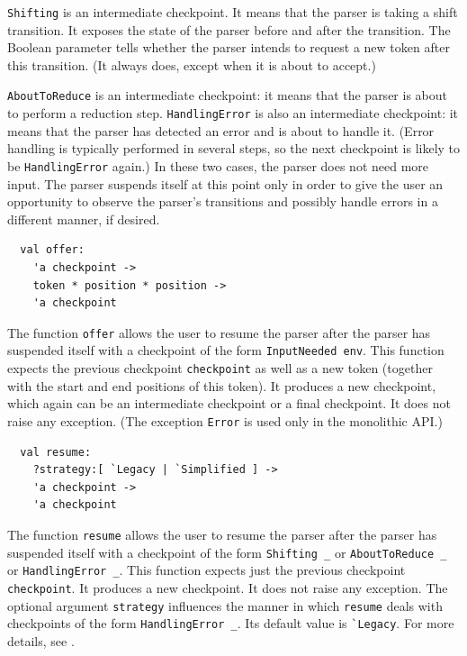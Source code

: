 \documentclass[onecolumn,11pt,nocopyrightspace,preprint]{sigplanconf}
\begin{document}
\verb+Shifting+ is an intermediate checkpoint. It means that the parser is taking
a shift transition. It exposes the state of the parser before and after the
transition. The Boolean parameter tells whether the parser intends to request
a new token after this transition. (It always does, except when it is about to
accept.)

\verb+AboutToReduce+ is an intermediate checkpoint: it means that the parser is
about to perform a reduction step. \verb+HandlingError+ is also an
intermediate checkpoint: it means that the parser has detected an error and is
about to handle it. (Error handling is typically performed in several steps,
so the next checkpoint is likely to be \verb+HandlingError+ again.) In these two
cases, the parser does not need more input. The parser suspends itself at this
point only in order to give the user an opportunity to observe the parser's
transitions and possibly handle errors in a different manner, if desired.


\begin{verbatim}
  val offer:
    'a checkpoint ->
    token * position * position ->
    'a checkpoint
\end{verbatim}

The function \verb+offer+ allows the user to resume the parser after the
parser has suspended itself with a checkpoint of the form \verb+InputNeeded env+.
This function expects the previous checkpoint \verb+checkpoint+ as well as a new token
(together with the start and end positions of this token). It produces a new
checkpoint, which again can be an intermediate checkpoint or a final checkpoint. It does
not raise any exception. (The exception \texttt{Error} is used only in the
monolithic API.)


\begin{verbatim}
  val resume:
    ?strategy:[ `Legacy | `Simplified ] ->
    'a checkpoint ->
    'a checkpoint
\end{verbatim}

The function \verb+resume+ allows the user to resume the parser after the
parser has suspended itself with a checkpoint of the form
\verb+Shifting _+ or \verb+AboutToReduce _+ or \verb+HandlingError _+.
This function expects just the previous checkpoint \verb+checkpoint+. It produces a new
checkpoint. It does not raise any exception.
%
The optional argument \verb+strategy+ influences the manner in which
\verb+resume+ deals with checkpoints of the form \verb+HandlingError _+. Its
default value is \verb+`Legacy+. For more details, see .
\end{document}
